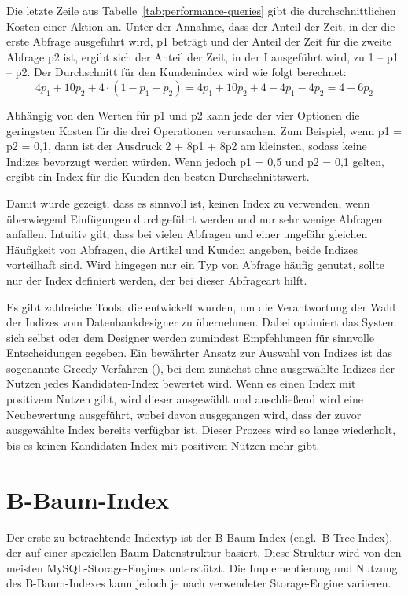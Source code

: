 Die letzte Zeile aus Tabelle~\ref{tab:performance-queries} gibt die durchschnittlichen Kosten einer Aktion an.
Unter der Annahme, dass der Anteil der Zeit, in der die erste Abfrage ausgeführt wird, p1 beträgt und der Anteil der Zeit für die zweite Abfrage p2 ist, ergibt sich der Anteil der Zeit, in der I ausgeführt wird, zu 1 – p1 – p2.
Der Durchschnitt für den Kundenindex wird wie folgt berechnet:
\[
    4p_{1} + 10p_{2} + 4 \cdot (1 - p_{1} - p_{2}) = 4p_{1} + 10p_{2} + 4 - 4p_{1} - 4p_{2} = 4 + 6p_{2}
\]

Abhängig von den Werten für p1 und p2 kann jede der vier Optionen die geringsten Kosten für die drei Operationen verursachen.
Zum Beispiel, wenn p1 = p2 = 0,1, dann ist der Ausdruck 2 + 8p1 + 8p2 am kleinsten, sodass keine Indizes bevorzugt werden würden.
Wenn jedoch p1 = 0,5 und p2 = 0,1 gelten, ergibt ein Index für die Kunden den besten Durchschnittswert.

Damit wurde gezeigt, dass es sinnvoll ist, keinen Index zu verwenden, wenn überwiegend Einfügungen durchgeführt werden und nur sehr wenige Abfragen anfallen.
Intuitiv gilt, dass bei vielen Abfragen und einer ungefähr gleichen Häufigkeit von Abfragen, die Artikel und Kunden angeben, beide Indizes vorteilhaft sind.
Wird hingegen nur ein Typ von Abfrage häufig genutzt, sollte nur der Index definiert werden, der bei dieser Abfrageart hilft.

Es gibt zahlreiche Tools, die entwickelt wurden, um die Verantwortung der Wahl der Indizes vom Datenbankdesigner zu übernehmen.
Dabei optimiert das System sich selbst oder dem Designer werden zumindest Empfehlungen für sinnvolle Entscheidungen gegeben.
Ein bewährter Ansatz zur Auswahl von Indizes ist das sogenannte Greedy-Verfahren (\cite[S. 824]{garcia2008database}), bei dem zunächst ohne ausgewählte Indizes der Nutzen jedes Kandidaten-Index bewertet wird.
Wenn es einen Index mit positivem Nutzen gibt, wird dieser ausgewählt und anschließend wird eine Neubewertung ausgeführt, wobei davon ausgegangen wird, dass der zuvor ausgewählte Index bereits verfügbar ist.
Dieser Prozess wird so lange wiederholt, bis es keinen Kandidaten-Index mit positivem Nutzen mehr gibt.

\newpage
\section{B-Baum-Index}\label{sec:indexing-b-baum-index}

Der erste zu betrachtende Indextyp ist der B-Baum-Index (engl.\ B-Tree Index), der auf einer speziellen Baum-Datenstruktur basiert.
Diese Struktur wird von den meisten MySQL-Storage-Engines unterstützt.
Die Implementierung und Nutzung des B-Baum-Indexes kann jedoch je nach verwendeter Storage-Engine variieren.


